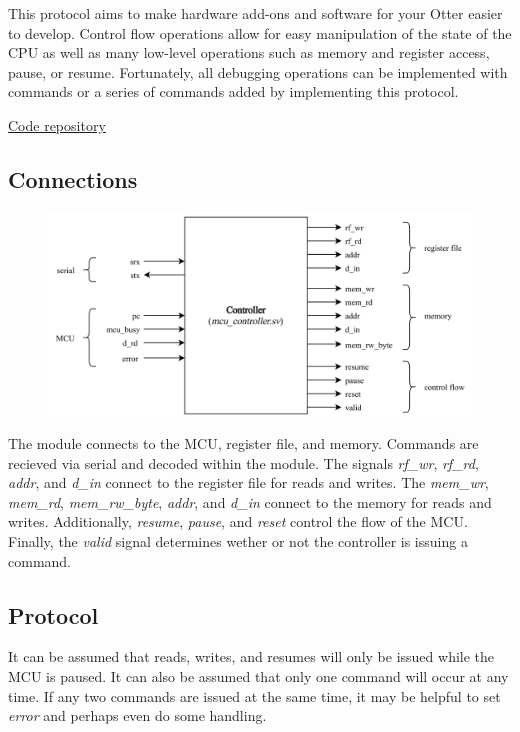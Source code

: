 \documentclass[10pt,a4paper]{article}
\begin{document}
This protocol aims to make hardware add-ons and software for your Otter easier to develop. Control flow operations
allow for easy manipulation of the state of the CPU as well as many low-level operations such as
memory and register access, pause, or resume. Fortunately, all debugging operations can be implemented with
commands or a series of commands added by implementing this protocol.

\medskip
\noindent\underline{\href{https://github.com/trmckay/riscv-uart-debugger}{Code repository}}

\subsection{Connections}

\begin{figure}[H]
    \includegraphics[width=\textwidth]{blackbox}
\end{figure}
\medskip

The module connects to the MCU, register file, and memory. Commands are recieved via serial
and decoded within the module. The signals \emph{rf\_wr}, \emph{rf\_rd}, \emph{addr}, and
\emph{d\_in} connect to the register file for reads and writes. The \emph{mem\_wr},
\emph{mem\_rd}, \emph{mem\_rw\_byte}, \emph{addr}, and \emph{d\_in} connect to the memory
for reads and writes. Additionally, \emph{resume}, \emph{pause}, and \emph{reset} control
the flow of the MCU\@. Finally, the \emph{valid} signal determines wether or not the controller
is issuing a command.

\subsection{Protocol}

It can be assumed that reads, writes, and resumes will only be issued while the MCU is paused. It
can also be assumed that only one command will occur at any time. If any two commands are issued at the
same time, it may be helpful to set \emph{error} and perhaps even do some handling.
\end{document}
